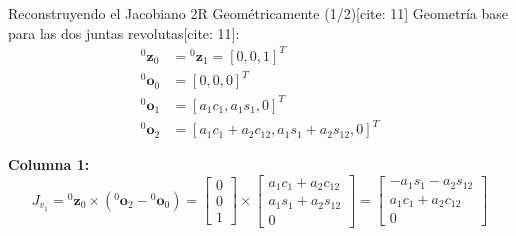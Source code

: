 \documentclass[aspectratio=169, xcolor={table,xcdraw}]{beamer}
\begin{document}
\begin{frame}{Reconstruyendo el Jacobiano 2R Geométricamente (1/2)[cite: 11]}
    Geometría base para las dos juntas revolutas[cite: 11]:
    \begin{align*}
        {}^0\mathbf{z}_0 &= {}^0\mathbf{z}_1 = [0, 0, 1]^T \\
        {}^0\mathbf{o}_0 &= [0, 0, 0]^T \\
        {}^0\mathbf{o}_1 &= [a_1c_1, a_1s_1, 0]^T \\
        {}^0\mathbf{o}_2 &= [a_1c_1+a_2c_{12}, a_1s_1+a_2s_{12}, 0]^T
    \end{align*}
    
    \textbf{Columna 1:}
    \begin{equation*}
        J_{v_1} = {}^0\mathbf{z}_0 \times ({}^0\mathbf{o}_2 - {}^0\mathbf{o}_0) = \begin{bmatrix} 0 \\ 0 \\ 1 \end{bmatrix} \times \begin{bmatrix} a_1c_1+a_2c_{12} \\ a_1s_1+a_2s_{12} \\ 0 \end{bmatrix} = \begin{bmatrix} -a_1s_1 - a_2s_{12} \\ a_1c_1 + a_2c_{12} \\ 0 \end{bmatrix}
    \end{equation*}
\end{frame}
\end{document}
